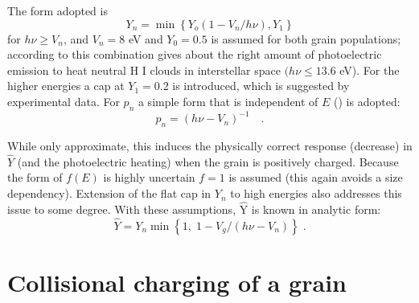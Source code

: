 The form adopted is
\begin{equation}
{Y_n} = \min \left\{ {{Y_o}\left( {1 - {V_n}/h\nu } \right),{Y_1}}
\right\}
\end{equation}
for $h\nu\ge  V_n$, and $V_n = 8$ eV and $Y_0 = 0.5$ is assumed for both grain populations;
according to \citet{Draine1978} this combination gives about the right amount
of photoelectric emission to heat neutral H I clouds in interstellar space
$(h\nu \le 13.6$ eV).  For the higher energies a cap at $Y_1 = 0.2$ is introduced,
which is suggested by experimental data.  For $p_n$ a simple form that is
independent of $E$ (\citealp{Draine1978}) is adopted:
\begin{equation}
{p_n} = {\left( {h\nu  - {V_n}} \right)^{ - 1}}\quad .
\end{equation}

While only approximate, this induces the physically correct response
(decrease) in $\hat Y$
(and the photoelectric heating) when the grain is positively charged.
Because the form of $f(E)$ is highly uncertain $f = 1$ is assumed (this again
avoids a size dependency).
Extension of the flat cap in $Y_n$ to high energies
also addresses this issue to some degree.
With these assumptions,
${\mathrm{\hat Y}}$
is known in analytic form:
\begin{equation}
\hat Y = {Y_n}\min \left\{ {1,\;1 - {V_g}/\left( {h\nu  - {V_n}} \right)}
\right\}\;.
\end{equation}

\section{Collisional charging of a grain}

